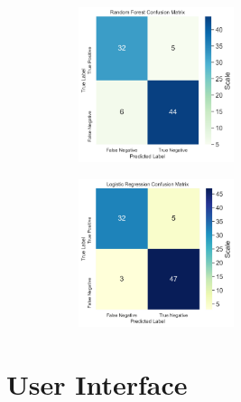 \documentclass[12pt]{article}
\begin{document}
\begin{center}
    \begin{figure}
        \begin{subfigure}{.8\textwidth}
            \centering
            \includegraphics[width=0.5\textwidth, height=0.6\textheight, keepaspectratio]{images/image6.png}
        \end{subfigure}
        \begin{subfigure}{.8\textwidth}
            \centering
            \includegraphics[width=0.5\textwidth, height=0.6\textheight, keepaspectratio]{images/image7.png}
        \end{subfigure}
    \end{figure}
\end{center}

\section*{User Interface}
\end{document}
